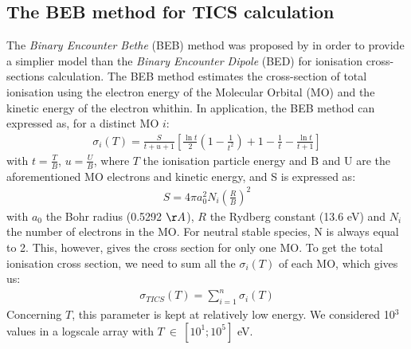 \documentclass[twocolumn, a4paper, twoside,10pt]{scrartcl}
\begin{document}
\subsection{The BEB method for TICS calculation} 
The \textit{Binary Encounter Bethe} (BEB) method was proposed by \citet{kimBinaryencounterdipoleModelElectronimpact1994} in order to provide a simplier model than the \textit{Binary Encounter Dipole} (BED) for ionisation cross-sections calculation. The BEB method estimates the cross-section of total ionisation using the electron energy of the Molecular Orbital (MO) and the kinetic energy of the electron whithin. In application, the BEB method can expressed as, for a distinct MO $i$:
\begin{align}
    \sigma_{i}(T) = \frac{S}{t+u+1} \left[\frac{\ln t}{2} \left(1-\frac{1}{t^2}\right)+1-\frac{1}{t}-\frac{\ln t}{t+1}\right] \label{eq:beb}
\end{align}
with $t=\frac{T}{B}$, $u=\frac{U}{B}$, where $T$ the ionisation particle energy and B and U are the  aforementioned MO electrons and kinetic energy, and S is expressed as:
\begin{align}
    S = 4\pi a_0^2N_i\left(\frac{R}{B}\right)^2
\end{align}
with $a_0$ the Bohr radius (0.5292 $\AA$), $R$ the Rydberg constant (13.6 eV) and $N_i$ the number of electrons in the MO. For neutral stable species, N is always equal to 2. This, however, gives the cross section for only one MO. To get the total ionisation cross section, we need to sum all the $\sigma_i(T)$ of each MO, which gives us:
\begin{align}
    \sigma_{TICS}(T) = \sum^n_{i=1} \sigma_i(T)
\end{align}
Concerning $T$, this parameter is kept at relatively low energy. We considered 10$^3$ values in a logscale array with $T~\in~[10^1;10^5]$ eV.  
\end{document}
